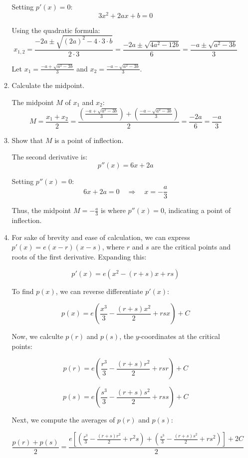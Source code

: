 \documentclass[12pt]{article}
\begin{document}
\begin{enumerate}[start=1,label={\bfseries. },leftmargin=1in]
\begin{enumerate}
   Setting \( p'(x) = 0 \):
   \[
   3x^2 + 2ax + b = 0
   \]

   Using the quadratic formula:
   \[
   x_{1,2} = \frac{-2a \pm \sqrt{(2a)^2 - 4 \cdot 3 \cdot b}}{2 \cdot 3} = \frac{-2a \pm \sqrt{4a^2 - 12b}}{6} = \frac{-a \pm \sqrt{a^2 - 3b}}{3}
   \]

   Let \( x_1 = \frac{-a + \sqrt{a^2 - 3b}}{3} \)  and \( x_2 = \frac{-a - \sqrt{a^2 - 3b}}{3} \).


    \item Calculate the midpoint.

   The midpoint \( M \) of \( x_1 \) and \( x_2 \):
   \[
   M = \frac{x_1 + x_2}{2} = \frac{\left(\frac{-a + \sqrt{a^2 - 3b}}{3}\right) + \left(\frac{-a - \sqrt{a^2 - 3b}}{3}\right)}{2} = \frac{-2a}{6} = \frac{-a}{3}
   \]

    \item Show that \( M \) is a point of inflection.

   The second derivative is:
   \[
   p''(x) = 6x + 2a
   \]

   Setting \( p''(x) = 0 \):
   \[
   6x + 2a = 0 \quad \Rightarrow \quad x = -\frac{a}{3}
   \]

   Thus, the midpoint \( M = -\frac{a}{3} \) is where \( p''(x) = 0 \), indicating a point of inflection.

    \item 
    For sake of brevity and ease of calculation, we can express \( p'(x) = e(x - r)(x - s) \), where \( r \) and \( s \) are the critical points and roots of the first derivative. Expanding this:

    \[
    p'(x) = e(x^2 - (r+s)x + rs)
    \]

    To find \( p(x) \), we can reverse differentiate $p'(x)$:

    \[
    p(x) = e\left(\frac{x^3}{3} - \frac{(r+s)x^2}{2} + rsx\right) + C
    \]

    Now, we calculte \( p(r) \) and \( p(s) \), the \( y \)-coordinates at the critical points:

    \[
    p(r) = e\left(\frac{r^3}{3} - \frac{(r+s)r^2}{2} + rsr\right) + C
    \]

    \[
    p(s) = e\left(\frac{s^3}{3} - \frac{(r+s)s^2}{2} + rss\right) + C
    \]

    Next, we compute the averages of \( p(r) \) and \( p(s) \):

    \[
    \frac{p(r) + p(s)}{2} = \frac{e\left[\left(\frac{r^3}{3} - \frac{(r+s)r^2}{2} + r^2s\right) + \left(\frac{s^3}{3} - \frac{(r+s)s^2}{2} + rs^2\right)\right] + 2C}{2}
    \]


\end{enumerate}
\end{enumerate}
\end{document}
